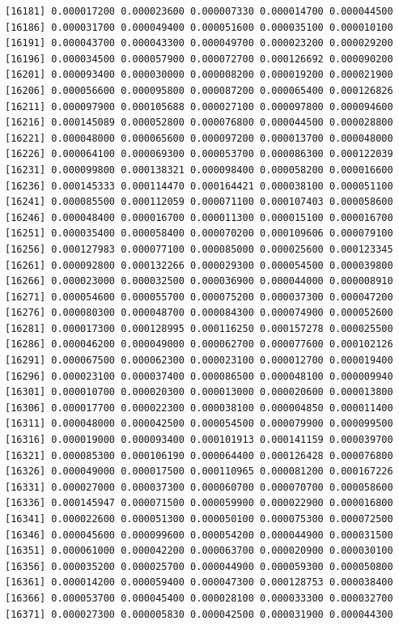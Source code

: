 \documentclass[]{article}
\begin{document}
\begin{verbatim}
[16181] 0.000017200 0.000023600 0.000007330 0.000014700 0.000044500
[16186] 0.000031700 0.000049400 0.000051600 0.000035100 0.000010100
[16191] 0.000043700 0.000043300 0.000049700 0.000023200 0.000029200
[16196] 0.000034500 0.000057900 0.000072700 0.000126692 0.000090200
[16201] 0.000093400 0.000030000 0.000008200 0.000019200 0.000021900
[16206] 0.000056600 0.000095800 0.000087200 0.000065400 0.000126826
[16211] 0.000097900 0.000105688 0.000027100 0.000097800 0.000094600
[16216] 0.000145089 0.000052800 0.000076800 0.000044500 0.000028800
[16221] 0.000048000 0.000065600 0.000097200 0.000013700 0.000048000
[16226] 0.000064100 0.000069300 0.000053700 0.000086300 0.000122039
[16231] 0.000099800 0.000138321 0.000098400 0.000058200 0.000016600
[16236] 0.000145333 0.000114470 0.000164421 0.000038100 0.000051100
[16241] 0.000085500 0.000112059 0.000071100 0.000107403 0.000058600
[16246] 0.000048400 0.000016700 0.000011300 0.000015100 0.000016700
[16251] 0.000035400 0.000058400 0.000070200 0.000109606 0.000079100
[16256] 0.000127983 0.000077100 0.000085000 0.000025600 0.000123345
[16261] 0.000092800 0.000132266 0.000029300 0.000054500 0.000039800
[16266] 0.000023000 0.000032500 0.000036900 0.000044000 0.000008910
[16271] 0.000054600 0.000055700 0.000075200 0.000037300 0.000047200
[16276] 0.000080300 0.000048700 0.000084300 0.000074900 0.000052600
[16281] 0.000017300 0.000128995 0.000116250 0.000157278 0.000025500
[16286] 0.000046200 0.000049000 0.000062700 0.000077600 0.000102126
[16291] 0.000067500 0.000062300 0.000023100 0.000012700 0.000019400
[16296] 0.000023100 0.000037400 0.000086500 0.000048100 0.000009940
[16301] 0.000010700 0.000020300 0.000013000 0.000020600 0.000013800
[16306] 0.000017700 0.000022300 0.000038100 0.000004850 0.000011400
[16311] 0.000048000 0.000042500 0.000054500 0.000079900 0.000099500
[16316] 0.000019000 0.000093400 0.000101913 0.000141159 0.000039700
[16321] 0.000085300 0.000106190 0.000064400 0.000126428 0.000076800
[16326] 0.000049000 0.000017500 0.000110965 0.000081200 0.000167226
[16331] 0.000027000 0.000037300 0.000060700 0.000070700 0.000058600
[16336] 0.000145947 0.000071500 0.000059900 0.000022900 0.000016800
[16341] 0.000022600 0.000051300 0.000050100 0.000075300 0.000072500
[16346] 0.000045600 0.000099600 0.000054200 0.000044900 0.000031500
[16351] 0.000061000 0.000042200 0.000063700 0.000020900 0.000030100
[16356] 0.000035200 0.000025700 0.000044900 0.000059300 0.000050800
[16361] 0.000014200 0.000059400 0.000047300 0.000128753 0.000038400
[16366] 0.000053700 0.000045400 0.000028100 0.000033300 0.000032700
[16371] 0.000027300 0.000005830 0.000042500 0.000031900 0.000044300

\end{verbatim}
\end{document}
